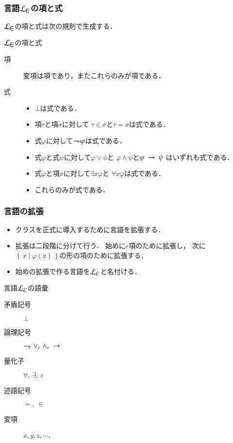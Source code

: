 \documentclass[dvipdfmx,10pt,notheorems]{beamer}
\theoremstyle{definition}
\newcommand{\lang}[1]{\mathcal{L}_{\scalebox{1.2}{$#1$}}} %
\newcommand{\Set}[2]{\left\{\, #1 \mid #2\, \right\}} %
\newcommand{\negation}{\rightharpoondown\hspace{-0.25em}} %
\newcommand{\rarrow}{\hspace{0.25em}\rightarrow\hspace{0.25em}} %
\begin{document}
\begin{frame}\frametitle{言語$\lang{\in}$の項と式}
	$\lang{\in}$の項と式は次の規則で生成する．
	
	\begin{exampleblock}{$\lang{\in}$の項と式}
		\begin{description}
			\item[項] 変項は項であり，またこれらのみが項である．
				
			\item[式] 
				\begin{itemize}
					\item $\bot$は式である．
					\item 項$\tau$と項$\sigma$に対して
						$\tau \in \sigma$と$\tau = \sigma$は式である．
					\item 式$\varphi$に対して$\negation \varphi$は式である．
					\item 式$\varphi$と式$\psi$に対して$\varphi \vee \psi$と
						$\varphi \wedge \psi$と$\varphi \rarrow \psi$
						はいずれも式である．
					\item 式$\varphi$と項$x$に対して$\exists x \varphi$と
						$\forall x \varphi$は式である．
					\item これらのみが式である．
				\end{itemize}
		\end{description}
	\end{exampleblock}
\end{frame}

\begin{frame}\frametitle{言語の拡張}
	\begin{itemize}
		\item クラスを正式に導入するために言語を拡張する．
		\item 拡張は二段階に分けて行う．
			始めに$\varepsilon$項のために拡張し，
			次に$\Set{x}{\varphi(x)}$の形の項のために拡張する．
			
		\item 始めの拡張で作る言語を$\lang{\varepsilon}$と名付ける．
	\end{itemize}

	\begin{exampleblock}{言語$\lang{\varepsilon}$の語彙}
		\begin{description}
			\item[矛盾記号] $\bot$
			\item[論理記号] $\negation,\ \vee,\ \wedge,\ \rarrow$
			\item[量化子] $\forall,\ \exists,\ \varepsilon$
			\item[述語記号] $=,\ \in$
			\item[変項] $x,y,z,\cdots$．
		\end{description}
	\end{exampleblock}
\end{frame}
\end{document}
